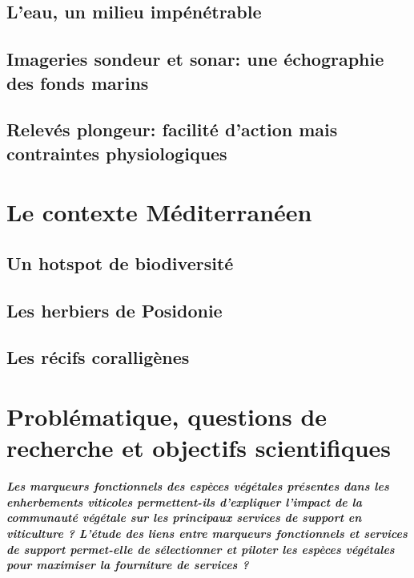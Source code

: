\subsection{L'eau, un milieu impénétrable}\label{intro.2.1}
\subsection{Imageries sondeur et sonar: une échographie des fonds marins}\label{intro.2.2}
\subsection{Relevés plongeur: facilité d'action mais contraintes physiologiques}\label{intro.2.3}

\newpage

\section{Le contexte Méditerranéen}\label{intro.3}
\subsection{Un hotspot de biodiversité}\label{intro.3.1}
\subsection{Les herbiers de Posidonie}\label{intro.3.2}
\subsection{Les récifs coralligènes}\label{intro.3.3}

\newpage

\section[Problématique et objectifs scientifiques]{Problématique, questions de recherche et objectifs scientifiques}\label{intro.4}


\medskip
\noindent\textbf{\textit{Les marqueurs fonctionnels des espèces végétales présentes dans les enherbements viticoles permettent-ils d'expliquer l'impact de la communauté végétale sur les principaux services de support en viticulture ? L'étude des liens entre marqueurs fonctionnels et services de support permet-elle de sélectionner et piloter les espèces végétales pour maximiser la fourniture de services ?}}
\medskip


